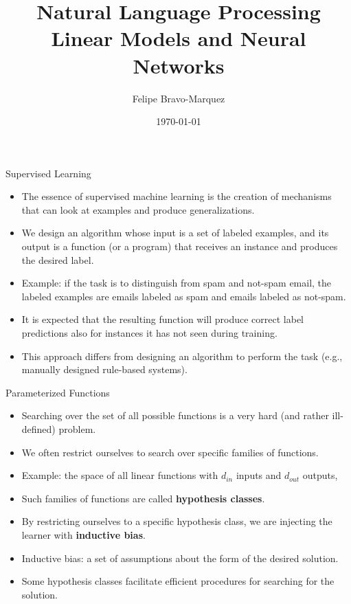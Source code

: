 \documentclass[handout]{beamer}
\title{Natural Language Processing \\ Linear Models and Neural Networks}
\author[Felipe Bravo Márquez]{\footnotesize
 \textcolor[rgb]{0.00,0.00,1.00}{Felipe Bravo-Marquez}}
\date{\today}
\begin{document}
\begin{frame}
\titlepage


\end{frame}



\begin{frame}{Supervised Learning}
\begin{scriptsize}
\begin{itemize}
\item The essence of supervised machine learning is the creation of mechanisms that can look at examples and produce generalizations. \cite{goldberg2017neural}
\item We design an algorithm whose input is a set of labeled examples, and
its output is a function (or a program) that receives an instance and produces the desired label.
\item Example: if the task is to distinguish from spam and not-spam email, the labeled examples are emails labeled as spam and emails labeled as not-spam.
\item It is expected that the resulting function will produce correct label
predictions also for instances it has not seen during training.
\item This approach differs from designing an algorithm to perform the task (e.g., manually designed rule-based systems).
\end{itemize}


\end{scriptsize}
\end{frame}


\begin{frame}{Parameterized Functions}
\begin{scriptsize}
\begin{itemize}
\item Searching over the set of all possible functions is a very hard (and rather ill-defined) problem. \cite{goldberg2017neural}
\item We often restrict ourselves to search over specific families of functions.
\item Example: the space of all linear functions with $d_{in}$ inputs and $d_{out}$ outputs, 
\item Such families of functions are called \textbf{hypothesis classes}. 
\item By restricting ourselves to a specific hypothesis class, we are injecting the learner with \textbf{inductive bias}.
\item Inductive bias: a set of assumptions about the form of the desired solution.
\item Some hypothesis classes facilitate efficient procedures for searching for the solution. \cite{goldberg2017neural}
\end{itemize}


\end{scriptsize}
\end{frame}
\end{document}
